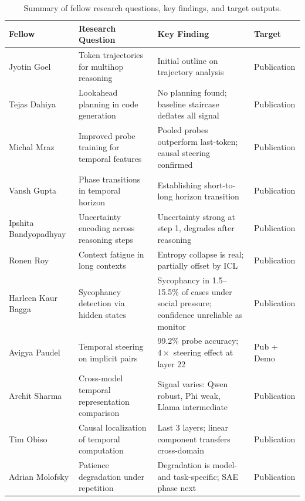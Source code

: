 \documentclass[final]{sparreport}
\begin{document}
\begin{table}[htbp]
\centering
\small
\begin{tabular}{p{2.2cm}p{4.5cm}p{4.5cm}p{2cm}}
\toprule
\textbf{Fellow} & \textbf{Research Question} & \textbf{Key Finding} & \textbf{Target} \\
\midrule
Jyotin Goel & Token trajectories for multihop reasoning & Initial outline on trajectory analysis & Publication \\
Tejas Dahiya & Lookahead planning in code generation & No planning found; baseline staircase deflates all signal & Publication \\
Michal Mraz & Improved probe training for temporal features & Pooled probes outperform last-token; causal steering confirmed & Publication \\
Vansh Gupta & Phase transitions in temporal horizon & Establishing short-to-long horizon transition & Publication \\
Ipshita Bandyopadhyay & Uncertainty encoding across reasoning steps & Uncertainty strong at step 1, degrades after reasoning & Publication \\
Ronen Roy & Context fatigue in long contexts & Entropy collapse is real; partially offset by ICL & Publication \\
Harleen Kaur Bagga & Sycophancy detection via hidden states & Sycophancy in 1.5--15.5\% of cases under social pressure; confidence unreliable as monitor & Publication \\
Avigya Paudel & Temporal steering on implicit pairs & 99.2\% probe accuracy; $4\times$ steering effect at layer 22 & Pub + Demo \\
Archit Sharma & Cross-model temporal representation comparison & Signal varies: Qwen robust, Phi weak, Llama intermediate & Publication \\
Tim Obiso & Causal localization of temporal computation & Last 3 layers; linear component transfers cross-domain & Publication \\
Adrian Molofsky & Patience degradation under repetition & Degradation is model- and task-specific; SAE phase next & Publication \\
\bottomrule
\end{tabular}
\caption{Summary of fellow research questions, key findings, and target outputs.}
\label{tab:fellows}
\end{table}

\end{document}
